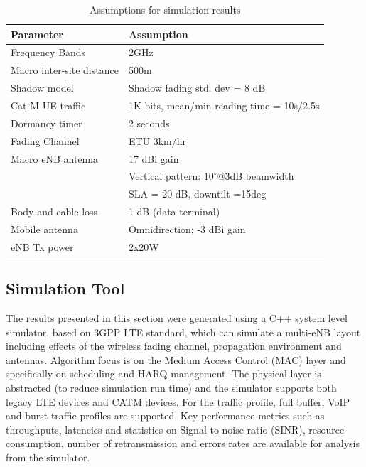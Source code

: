 \documentclass[conference,compsoc]{IEEEtran}
\begin{document}
\begin{table}
    \begin{tabular}{|l|l|}
    \hline
        {\bf Parameter} & {\bf Assumption} \\ 
    \hline
    \hline
        Frequency Bands & 2GHz \\
        \hline
        Macro inter-site distance & 500m \\
\hline
    Shadow model & Shadow fading std. dev = 8 dB \\
    \hline
    Cat-M UE traffic &	1K bits, mean/min reading time = 10s/2.5s \\
        \hline
        Dormancy timer & 2 seconds \\
    \hline
    Fading Channel  &	ETU 3km/hr \\
        \hline
    Macro eNB antenna &	17 dBi gain \\
        & Vertical pattern: $10^{\circ}$@3dB beamwidth \\
        & SLA = 20 dB, downtilt =15deg \\
     \hline
    Body and cable loss	& 1 dB (data terminal) \\
    \hline
    Mobile antenna	& Omnidirection; -3 dBi gain \\
    \hline
    eNB Tx power & 	2x20W \\
    \hline
\end{tabular}
    \label{table_assump}
    \caption{Assumptions for simulation results}
\end{table}

\subsection{Simulation Tool}
The results presented in this section were generated using a C++ system level simulator, based on $3$GPP LTE standard, which can simulate a multi-eNB layout including effects of the wireless fading channel, propagation environment and antennas. Algorithm focus is on the Medium Access Control (MAC) layer and specifically on scheduling and HARQ management. The physical layer is abstracted (to reduce simulation run time) and the simulator supports both legacy LTE devices and CATM devices. For the traffic profile, full buffer, VoIP and burst traffic profiles are supported. Key performance metrics such as throughputs, latencies and statistics on Signal to noise ratio (SINR), resource consumption, number of retransmission and errors rates are available for analysis from the simulator.   
\end{document}
